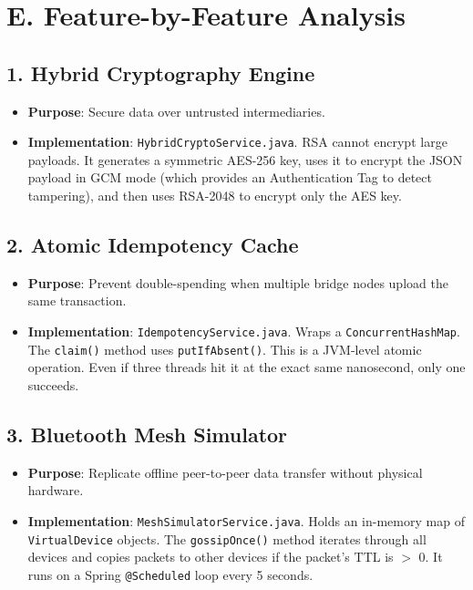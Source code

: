 \documentclass[11pt, a4paper]{article}
\begin{document}
\section*{E. Feature-by-Feature Analysis}

\subsection*{1. Hybrid Cryptography Engine}
\begin{itemize}
    \item \textbf{Purpose}: Secure data over untrusted intermediaries.
    \item \textbf{Implementation}: \texttt{HybridCryptoService.java}. RSA cannot encrypt large payloads. It generates a symmetric AES-256 key, uses it to encrypt the JSON payload in GCM mode (which provides an Authentication Tag to detect tampering), and then uses RSA-2048 to encrypt only the AES key.
\end{itemize}

\subsection*{2. Atomic Idempotency Cache}
\begin{itemize}
    \item \textbf{Purpose}: Prevent double-spending when multiple bridge nodes upload the same transaction.
    \item \textbf{Implementation}: \texttt{IdempotencyService.java}. Wraps a \texttt{ConcurrentHashMap}. The \texttt{claim()} method uses \texttt{putIfAbsent()}. This is a JVM-level atomic operation. Even if three threads hit it at the exact same nanosecond, only one succeeds.
\end{itemize}

\subsection*{3. Bluetooth Mesh Simulator}
\begin{itemize}
    \item \textbf{Purpose}: Replicate offline peer-to-peer data transfer without physical hardware.
    \item \textbf{Implementation}: \texttt{MeshSimulatorService.java}. Holds an in-memory map of \texttt{VirtualDevice} objects. The \texttt{gossipOnce()} method iterates through all devices and copies packets to other devices if the packet's TTL is $>$ 0. It runs on a Spring \texttt{@Scheduled} loop every 5 seconds.
\end{itemize}
\end{document}
